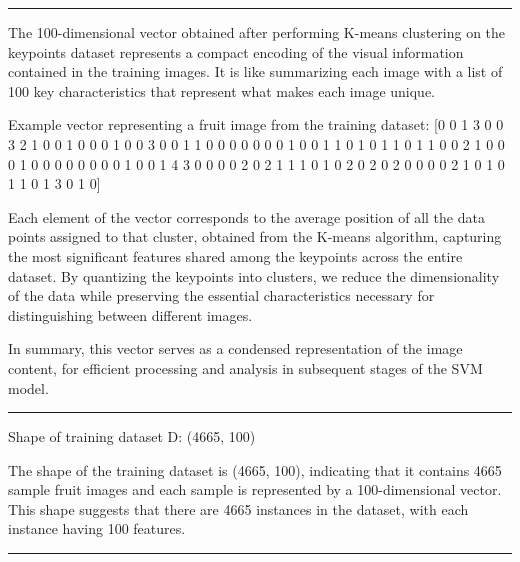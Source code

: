 \documentclass[a4paper,10 pt]{article}
\begin{document}
  \vspace{12pt}

  \hrule 

  \vspace{12pt}
  The 100-dimensional vector obtained after performing K-means clustering on the keypoints dataset represents a compact encoding of the visual information contained in the training images. It is like summarizing each image with a list of 100 key characteristics that represent what makes each image unique. 
  
  \vspace{12pt}

  Example vector representing a fruit image from the training dataset: 
  [0 0 1 3 0 0 3 2 1 0 0 1 0 0 0 1 0 0 3 0 0 1 1 0 0 0 0 0 0 0 1 0 0 1 1 0 1 0 1 1 0 1 1 0 0 2 1 0 0 0 1 0 0 0 0 0 0 0 0 1 0 0 1 4 3 0 0 0 0 2 0 2 1 1 1 0 1 0 2 0 2 0 2 0 0 0 0 2 1 0 1 0 1 1 0 1 3 0 1 0]

  \vspace{12pt}

  Each element of the vector corresponds to the average position of all the data points assigned to that cluster, obtained from the K-means algorithm, capturing the most significant features shared among the keypoints across the entire dataset. By quantizing the keypoints into clusters, we reduce the dimensionality of the data while preserving the essential characteristics necessary for distinguishing between different images. 
   \vspace{12pt}

  In summary, this vector serves as a condensed representation of the image content, for efficient processing and analysis in subsequent stages of the SVM model.

  \vspace{12pt}

  \hrule 

  \vspace{12pt}

  Shape of training dataset D: (4665, 100)
  \vspace{12pt} 

  The shape of the training dataset is (4665, 100), indicating that it contains 4665 sample fruit images and each sample is represented by a 100-dimensional vector. This shape suggests that there are 4665 instances in the dataset, with each instance having 100 features. 

  \vspace{12pt}

  \hrule 
\end{document}

